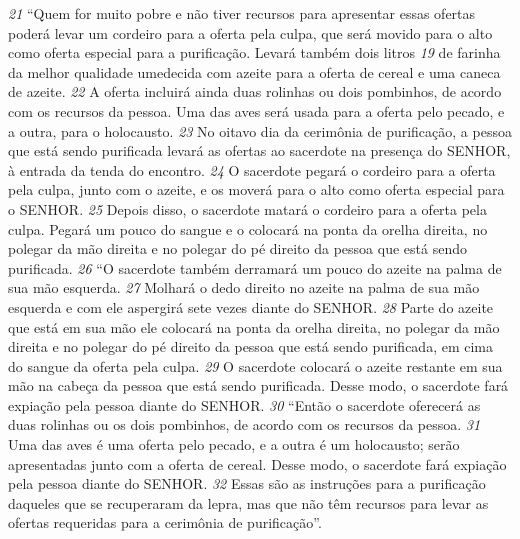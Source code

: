 \bigskip
\textit{\tiny 21}
“Quem for muito pobre e não tiver recursos para apresentar essas ofertas
poderá levar um cordeiro para a oferta pela culpa, que será movido para o alto
como oferta especial para a purificação. Levará também dois litros
\textit{\tiny 19}
 de farinha da
melhor qualidade umedecida com azeite para a oferta de cereal e uma caneca de
azeite. 
\textit{\tiny 22}
A oferta incluirá ainda duas rolinhas ou dois pombinhos, de acordo com
os recursos da pessoa. Uma das aves será usada para a oferta pelo pecado, e a
outra, para o holocausto. 
\textit{\tiny 23}
No oitavo dia da cerimônia de purificação, a pessoa
que está sendo purificada levará as ofertas ao sacerdote na presença do SENHOR, à
entrada da tenda do encontro. 
\textit{\tiny 24}
O sacerdote pegará o cordeiro para a oferta pela
culpa, junto com o azeite, e os moverá para o alto como oferta especial para o
SENHOR. 
\textit{\tiny 25}
Depois disso, o sacerdote matará o cordeiro para a oferta pela culpa.
Pegará um pouco do sangue e o colocará na ponta da orelha direita, no polegar da
mão direita e no polegar do pé direito da pessoa que está sendo purificada.
\textit{\tiny 26}
“O sacerdote também derramará um pouco do azeite na palma de sua mão
esquerda. 
\textit{\tiny 27}
Molhará o dedo direito no azeite na palma de sua mão esquerda e
com ele aspergirá sete vezes diante do SENHOR. 
\textit{\tiny 28}
Parte do azeite que está em sua
mão ele colocará na ponta da orelha direita, no polegar da mão direita e no
polegar do pé direito da pessoa que está sendo purificada, em cima do sangue da
oferta pela culpa. 
\textit{\tiny 29}
O sacerdote colocará o azeite restante em sua mão na cabeça
da pessoa que está sendo purificada. Desse modo, o sacerdote fará expiação pela
pessoa diante do SENHOR.
\textit{\tiny 30}
“Então o sacerdote oferecerá as duas rolinhas ou os dois pombinhos, de
acordo com os recursos da pessoa. 
\textit{\tiny 31}
Uma das aves é uma oferta pelo pecado, e a
outra é um holocausto; serão apresentadas junto com a oferta de cereal. Desse
modo, o sacerdote fará expiação pela pessoa diante do SENHOR. 
\textit{\tiny 32}
Essas são as
instruções para a purificação daqueles que se recuperaram da lepra, mas que não
têm recursos para levar as ofertas requeridas para a cerimônia de purificação”.


